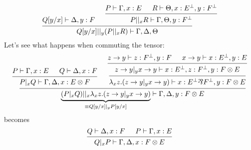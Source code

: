 \documentclass[a4paper,12pt]{book}
\begin{document}
\[\begin{prooftree}\hypo{Q[y/x] \vdash \Delta, y:F}
			\hypo{P \vdash \Gamma,x:E}
			\hypo{R \vdash \Theta,x:E^\bot,y:F^\bot}
		\infer2{P ||_x R \vdash \Gamma,\Theta,y:F^\bot}
	\infer2{Q[y/x] ||_y (P ||_x R) \vdash \Gamma,\Delta,\Theta}\end{prooftree}\]
Let's see what happens when commuting the tensor:\\
\[\begin{prooftree}\hypo{P \vdash \Gamma,x:E}
			\hypo{Q \vdash \Delta,x:F}
		\infer2{P |_x Q \vdash \Gamma,\Delta,x:E \logtensor F}
				\hypo{z\rightarrow y \vdash z:F^\bot,y:F}
				\hypo{x\rightarrow y \vdash x:E^\bot,y:E}
			\infer2{z \rightarrow y |_y x \rightarrow y \vdash x:E^\bot,z:F^\bot,y:F \logtensor E}
		\infer1{\lambda_xz.(z \rightarrow y |_y x \rightarrow y) \vdash x:E^\bot \logpar F^\bot, y:F \logtensor E}
	\infer2{\underbrace{(P |_x Q) ||_x \lambda_xz.(z \rightarrow y |_y x \rightarrow y)}_{\equiv Q[y/x] |_y P[y/x]} \vdash \Gamma,\Delta,y:F \logtensor E}\end{prooftree}\]
becomes\\
\[\begin{prooftree}\hypo{Q \vdash \Delta,x:F}
	\hypo{P \vdash \Gamma,x:E}
	\infer2{Q |_x P \vdash \Gamma,\Delta,x:F \logtensor E}
	\end{prooftree}\]
\end{document}
